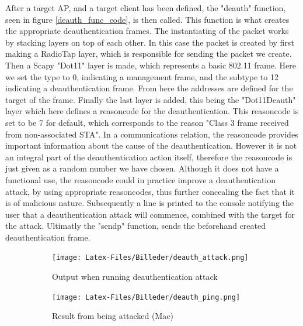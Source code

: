 After a target AP, and a target client has been defined, the "deauth" function, seen in figure \ref{deauth_func_code}, is then called. This function is what creates the appropriate deauthentication frames. The instantiating of the packet works by stacking layers on top of each other. In this case the packet is created by first making a RadioTap layer, which is responsible for sending the packet we create.
Then a Scapy "Dot11" layer is made, which represents a basic 802.11 frame. Here we set the type to 0, indicating a management frame, and the subtype to 12 indicating a deauthentication frame. From here the addresses are defined for the target of the frame. Finally the last layer is added, this being the "Dot11Deauth" layer which here defines a reasoncode for the deauthentication. This reasoncode is set to be 7 for default, which corresponds to the reason "Class 3 frame received from non-associated STA"\cite{Cisco_Deathentication_reasoncodes}. In a communications relation, the reasoncode provides important information about the cause of the deauthentication. However it is not an integral part of the deauthentication action itself, therefore the reasoncode is just given as a random number we have chosen.
Although it does not have a functional use, the reasoncode could in practice improve a deauthentication attack, by using appropriate reasoncodes, thus further concealing the fact that it is of malicious nature.
Subsequently a line is printed to the console notifying the user that a deauthentication attack will commence, combined with the target for the attack.
Ultimatly the "sendp" function, sends the beforehand created deauthentication frame.

\begin{figure}[!htbp]
     \centering
     \begin{subfigure}[b]{0.49\textwidth}
         \centering
         \texttt{[image: Latex-Files/Billeder/deauth\_attack.png]}
         \caption{Output when running deauthentication attack}
         \label{deauth_attack}
     \end{subfigure}
     \hfill
     \begin{subfigure}[b]{0.49\textwidth}
         \centering
         \texttt{[image: Latex-Files/Billeder/deauth\_ping.png]}
         \caption{Result from being attacked (Mac)}
         \label{deauth_ping}
     \end{subfigure}
     \hfill
     \caption{}
\end{figure}

